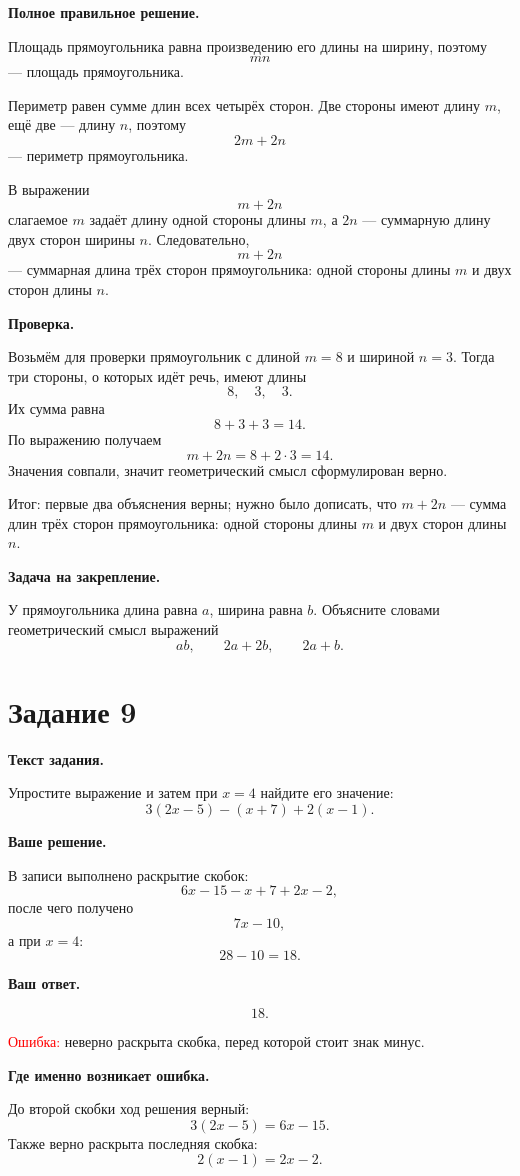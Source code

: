 \documentclass[12pt,a4paper]{article}
\begin{document}
\textbf{Полное правильное решение.}

Площадь прямоугольника равна произведению его длины на ширину, поэтому
\[
mn
\]
--- площадь прямоугольника.

Периметр равен сумме длин всех четырёх сторон. Две стороны имеют длину $m$, ещё две --- длину $n$, поэтому
\[
2m+2n
\]
--- периметр прямоугольника.

В выражении
\[
m+2n
\]
слагаемое $m$ задаёт длину одной стороны длины $m$, а $2n$ --- суммарную длину двух сторон ширины $n$. Следовательно,
\[
m+2n
\]
--- суммарная длина трёх сторон прямоугольника: одной стороны длины $m$ и двух сторон длины $n$.

\textbf{Проверка.}

Возьмём для проверки прямоугольник с длиной $m=8$ и шириной $n=3$. Тогда три стороны, о которых идёт речь, имеют длины
\[
8,\quad 3,\quad 3.
\]
Их сумма равна
\[
8+3+3=14.
\]
По выражению получаем
\[
m+2n=8+2\cdot 3=14.
\]
Значения совпали, значит геометрический смысл сформулирован верно.

\textcolor{teal!60!black}{Итог:} первые два объяснения верны; нужно было дописать, что $m+2n$ --- сумма длин трёх сторон прямоугольника: одной стороны длины $m$ и двух сторон длины $n$.

\textbf{Задача на закрепление.}

У прямоугольника длина равна $a$, ширина равна $b$. Объясните словами геометрический смысл выражений
\[
ab,\qquad 2a+2b,\qquad 2a+b.
\]

\newpage
{}\label{task:9}
\section*{Задание 9}

\textbf{Текст задания.}

Упростите выражение и затем при $x=4$ найдите его значение:
\[
3(2x-5)-(x+7)+2(x-1).
\]

\textbf{Ваше решение.}

В записи выполнено раскрытие скобок:
\[
6x-15-x+7+2x-2,
\]
после чего получено
\[
7x-10,
\]
а при $x=4$:
\[
28-10=18.
\]

\textbf{Ваш ответ.}

\[
18.
\]

\textcolor{red}{Ошибка:} неверно раскрыта скобка, перед которой стоит знак минус.

\textbf{Где именно возникает ошибка.}

До второй скобки ход решения верный:
\[
3(2x-5)=6x-15.
\]
Также верно раскрыта последняя скобка:
\[
2(x-1)=2x-2.
\]
\end{document}
